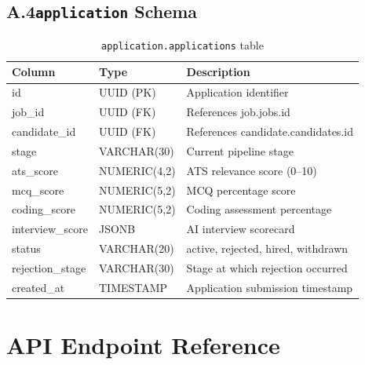 \section*{A.4\quad \texttt{application} Schema}

\begin{table}[htbp]
\centering
\caption{\texttt{application.applications} table}
\small
\begin{tabular}{p{1.5in}p{1.2in}p{2.8in}}
\toprule
\textbf{Column} & \textbf{Type} & \textbf{Description} \\
\midrule
id               & UUID (PK)  & Application identifier \\
job\_id          & UUID (FK)  & References job.jobs.id \\
candidate\_id    & UUID (FK)  & References candidate.candidates.id \\
stage            & VARCHAR(30) & Current pipeline stage \\
ats\_score       & NUMERIC(4,2) & ATS relevance score (0--10) \\
mcq\_score       & NUMERIC(5,2) & MCQ percentage score \\
coding\_score    & NUMERIC(5,2) & Coding assessment percentage \\
interview\_score & JSONB       & AI interview scorecard \\
status           & VARCHAR(20) & active, rejected, hired, withdrawn \\
rejection\_stage & VARCHAR(30) & Stage at which rejection occurred \\
created\_at      & TIMESTAMP   & Application submission timestamp \\
\bottomrule
\end{tabular}
\end{table}

\chapter{API Endpoint Reference}
\label{app:api}

